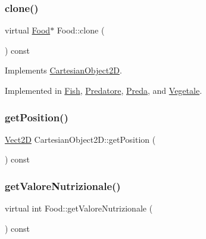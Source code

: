 \subsubsection{\texorpdfstring{clone()}{clone()}}
{\footnotesize\ttfamily virtual \hyperlink{classFood}{Food}$\ast$ Food\+::clone (\begin{DoxyParamCaption}{ }\end{DoxyParamCaption}) const\hspace{0.3cm}{\ttfamily [pure virtual]}}



Implements \hyperlink{classCartesianObject2D_afd883b92328b20defd9ed7af581206ab_afd883b92328b20defd9ed7af581206ab}{Cartesian\+Object2D}.



Implemented in \hyperlink{classFish_a6732945f7373a28b1723e55de8a65e13_a6732945f7373a28b1723e55de8a65e13}{Fish}, \hyperlink{classPredatore_a493b41e7df1542c10cdd646559514917_a493b41e7df1542c10cdd646559514917}{Predatore}, \hyperlink{classPreda_ab5db2883ca6f700012cbb14e63752290_ab5db2883ca6f700012cbb14e63752290}{Preda}, and \hyperlink{classVegetale_a969a0aae9c47a8dbb6acb3080fb98984_a969a0aae9c47a8dbb6acb3080fb98984}{Vegetale}.

\mbox{\label{classCartesianObject2D_aa3a6b63777852ab9eb9408ed2536abe2_aa3a6b63777852ab9eb9408ed2536abe2}} 
\subsubsection{\texorpdfstring{get\+Position()}{getPosition()}}
{\footnotesize\ttfamily \hyperlink{classVect2D}{Vect2D} Cartesian\+Object2\+D\+::get\+Position (\begin{DoxyParamCaption}{ }\end{DoxyParamCaption}) const\hspace{0.3cm}{\ttfamily [inherited]}}

\mbox{\label{classFood_a9bafe4a8c954c8e99395f25c19cc3eed_a9bafe4a8c954c8e99395f25c19cc3eed}} 
\subsubsection{\texorpdfstring{get\+Valore\+Nutrizionale()}{getValoreNutrizionale()}}
{\footnotesize\ttfamily virtual int Food\+::get\+Valore\+Nutrizionale (\begin{DoxyParamCaption}{ }\end{DoxyParamCaption}) const\hspace{0.3cm}{\ttfamily [pure virtual]}}



